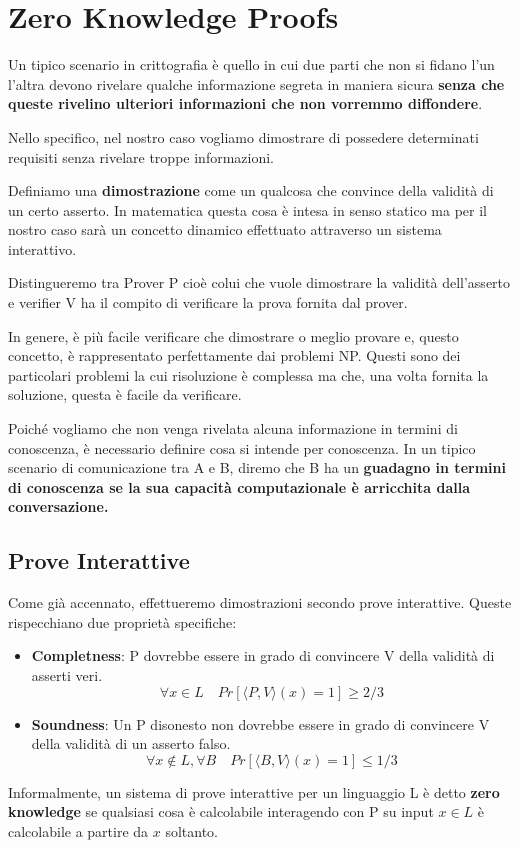 \chapter{Zero Knowledge Proofs}
Un tipico scenario in crittografia è quello in cui due parti che non si fidano l'un l'altra devono rivelare qualche informazione segreta in maniera sicura \textbf{senza che queste rivelino ulteriori informazioni che non vorremmo diffondere}.

Nello specifico, nel nostro caso vogliamo dimostrare di possedere determinati requisiti senza rivelare troppe informazioni.

Definiamo una \textbf{dimostrazione} come un qualcosa che convince della validità di un certo asserto. In matematica questa cosa è intesa in senso statico ma per il nostro caso sarà un concetto dinamico effettuato attraverso un sistema interattivo. 

Distingueremo tra Prover P cioè colui che vuole dimostrare la validità dell'asserto e verifier V ha il compito di verificare la prova fornita dal prover.

In genere, è più facile verificare che dimostrare o meglio provare e, questo concetto, è rappresentato perfettamente dai problemi NP. Questi sono dei particolari problemi la cui risoluzione è complessa ma che, una volta fornita la soluzione, questa è facile da verificare. 

Poiché vogliamo che non venga rivelata alcuna informazione in termini di conoscenza, è necessario definire cosa si intende per conoscenza. In un tipico scenario di comunicazione tra A e B, diremo che B ha un \textbf{guadagno in termini di conoscenza se la sua capacità computazionale è arricchita dalla conversazione.}
\section{Prove Interattive}
Come già accennato, effettueremo dimostrazioni secondo prove interattive. Queste rispecchiano due proprietà specifiche:
\begin{itemize}
    \item \textbf{Completness}: P dovrebbe essere in grado di convincere V della validità di asserti veri.
    \[\forall x \in L \quad Pr[\langle P, V\rangle(x)=1] \geq 2/3\]
    \item \textbf{Soundness}: Un P disonesto non dovrebbe essere in grado di convincere V della validità di un asserto falso.
    \[\forall x \notin L, \forall B \quad Pr[\langle B, V\rangle(x)=1] \leq 1/3\]
\end{itemize}
Informalmente, un sistema di prove interattive per un linguaggio L è detto \textbf{zero knowledge} se qualsiasi cosa è calcolabile interagendo con P su input $x \in L$ è calcolabile a partire da $x$ soltanto.

